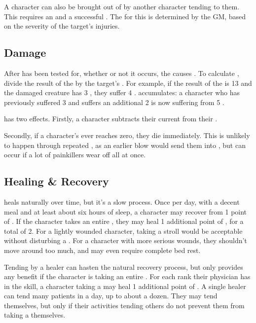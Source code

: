A character can also be brought out of {\shock} by another character tending to them.
This requires an {\action} and a successful  {\test}.
The {\tn} for this {\test} is determined by the GM, based on the severity of the target's injuries.

\subsection{Damage}

After {\shock} has been tested for, whether or not it occurs, the {\damagetest} causes {\damage}.
To calculate {\damage}, divide the result of the {\damagetest} by the target's .
For example, if the result of the {\damagetest} is 13 and the damaged creature has 3 , they suffer 4 {\damage}.
\capital{\damage} accumulates: a character who has previously suffered 3 {\damage} and suffers an additional 2 is now suffering from 5 {\damage}.

\capital{\damage} has two effects.
Firstly, a character subtracts their current {\damage} from their .

Secondly, if a character's  ever reaches zero, they die immediately.
This is unlikely to happen through repeated {\damage}, as an earlier blow would send them into {\shock}, but can occur if a lot of painkillers wear off all at once.

\subsection{Healing \& Recovery}

\capital{\damage} heals naturally over time, but it's a slow process.
Once per day, with a decent meal and at least about six hours of sleep, a character may recover from 1 point of {\damage}.
If the character takes an entire {\dayofrest}, they may heal 1 additional point of {\damage}, for a total of 2.
For a lightly wounded character, taking a stroll would be acceptable without disturbing a {\dayofrest}.
For a character with more serious wounds, they shouldn't move around too much, and may even require complete bed rest.

Tending by a healer can hasten the natural recovery process, but only provides any benefit if the character is taking an entire {\dayofrest}.
For each rank their physician has in the  skill, a character taking a {\dayofrest} may heal 1 additional point of {\damage}.
A single healer can tend many patients in a day, up to about a dozen.
They may tend themselves, but only if their activities tending others do not prevent them from taking a {\dayofrest} themselves.

